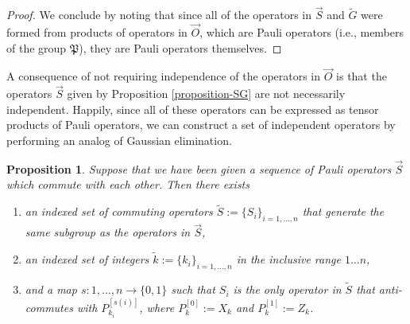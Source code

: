 \documentclass[twocolumn,showpacs,preprintnumbers,amsmath,amssymb,nofootinbib,pra,floatfix]{revtex4}
\newtheorem{proposition}{Proposition}
\newenvironment{remark}[1][Remark]{\begin{trivlist}
\item[\hskip \labelsep {\bfseries #1}]}{\end{trivlist}}
\newcommand{\lst}{\vec}
\newcommand{\set}{\tilde}
\newcommand{\pauligroup}{\mathfrak{P}}
\begin{document}
\begin{proof}
We conclude by noting that since all of the operators in $\lst S$ and $\set G$ were formed from products of operators in $\lst O$, which are Pauli operators (i.e., members of the group $\pauligroup$), they are Pauli operators themselves.
\end{proof}
\begin{remark}
A consequence of not requiring independence of the operators in $\lst O$ is that the operators $\lst S$ given by Proposition \ref{proposition-SG} are not necessarily independent.  Happily, since all of these operators can be expressed as tensor products of Pauli operators, we can construct a set of independent operators by performing an analog of Gaussian elimination.
\end{remark}

\begin{proposition}
\label{make-independent-using-elimination}
Suppose that we have been given a sequence of Pauli operators $\lst S$ which commute with each other.  Then there exists
\begin{enumerate}
\item an indexed set of commuting operators $\set S := \{S_i\}_{i=1,\dots,n}$ that generate the same subgroup as the operators in $\lst S$,
\item an indexed set of integers $\set k := \{k_i\}_{i=1,\dots,n}$ in the inclusive range $1\dots n$,
\item and a map $s:1,\dots, n \to \{0,1\}$ such that $S_i$ is the only operator in $\set S$ that anti-commutes with $P_{k_i}^{[s(i)]}$, where $P_k^{[0]}:=X_k$ and $P_k^{[1]}:=Z_k$.
\end{enumerate}
\end{proposition}
\end{document}
